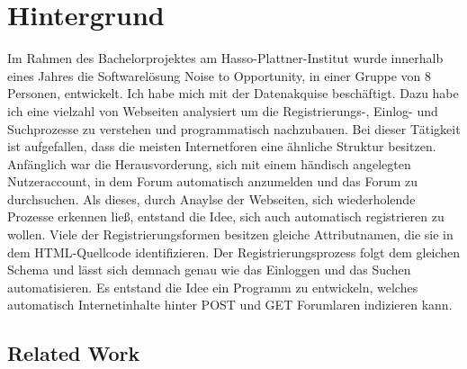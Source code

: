 \section{Hintergrund}

Im Rahmen des Bachelorprojektes am Hasso-Plattner-Institut wurde innerhalb eines Jahres die Softwarelösung Noise to Opportunity, in einer Gruppe von 8 Personen, entwickelt. Ich habe mich mit der Datenakquise beschäftigt. Dazu habe ich eine vielzahl von Webseiten analysiert um die Registrierungs-, Einlog- und Suchprozesse zu verstehen und programmatisch nachzubauen. Bei dieser Tätigkeit ist aufgefallen, dass die meisten Internetforen eine ähnliche Struktur besitzen. Anfänglich war die Herausvorderung, sich mit einem händisch angelegten Nutzeraccount, in dem Forum automatisch anzumelden und das Forum zu durchsuchen.  Als dieses, durch Anaylse der Webseiten, sich wiederholende Prozesse erkennen ließ, entstand die Idee, sich auch automatisch registrieren zu wollen.
Viele der Registrierungsformen besitzen gleiche Attributnamen, die sie in dem HTML-Quellcode identifizieren. Der Registrierungsprozess folgt dem gleichen Schema und lässt sich demnach genau wie das Einloggen und das Suchen automatisieren. Es entstand die Idee ein Programm zu entwickeln, welches automatisch Internetinhalte hinter POST und GET Forumlaren indizieren kann.

\subsection{Related Work}